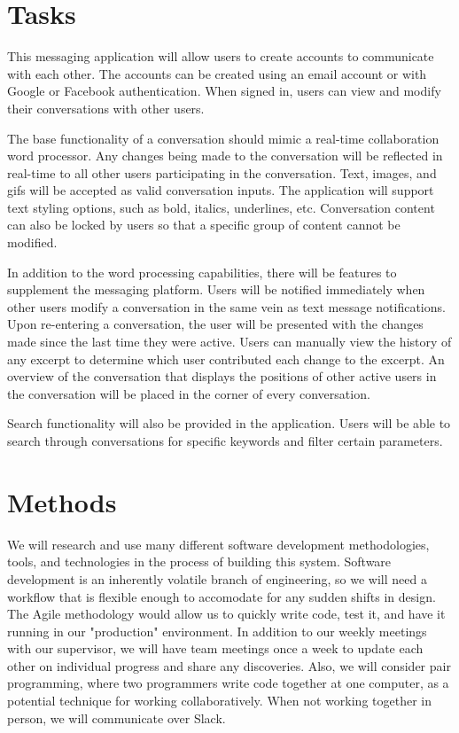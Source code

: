 \documentclass[11pt,letterpaper]{report}
\begin{document}
	\section*{Tasks}
	\markright{}
	This messaging application will allow users to create accounts to
	communicate with each other. The accounts can be created using an email
	account or with Google or Facebook authentication. When signed in, users
	can view and modify their conversations with other users.

	The base functionality of a conversation should mimic a real-time
	collaboration word processor. Any changes being made to the conversation
	will be reflected in real-time to all other users participating in the
	conversation. Text, images, and gifs will be accepted as valid conversation
	inputs. The application will support text styling options, such as bold,
	italics, underlines, etc. Conversation content can also be locked by users
	so that a specific group of content cannot be modified.

	In addition to the word processing capabilities, there will be features to
	supplement the messaging platform.  Users will be notified immediately when
	other users modify a conversation in the same vein as text message
	notifications. Upon re-entering a conversation, the user will be presented
	with the changes made since the last time they were active. Users can
	manually view the history of any excerpt to determine which user
	contributed each change to the excerpt. An overview of the conversation
	that displays the positions of other active users in the conversation will
	be placed in the corner of every conversation.

	Search functionality will also be provided in the application. Users will
	be able to search through conversations for specific keywords and filter
	certain parameters.

	\section*{Methods}
	\markright{}
	We will research and use many different software development methodologies,
	tools, and technologies in the process of building this system. Software
	development is an inherently volatile branch of engineering, so we will
	need a workflow that is flexible enough to accomodate for any sudden shifts
	in design. The Agile methodology would allow us to quickly write code, test
	it, and have it running in our "production" environment. In addition to our
	weekly meetings with our supervisor, we will have team meetings once a week
	to update each other on individual progress and share any discoveries.
	Also, we will consider pair programming, where two programmers write code
	together at one computer, as a potential technique for working
	collaboratively. When not working together in person, we will communicate
	over Slack.
\end{document}
